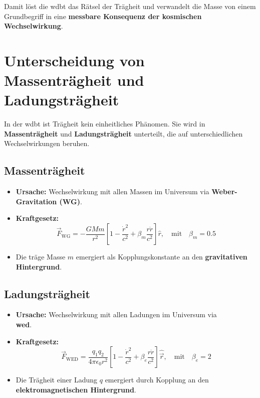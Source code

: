 Damit löst die \gls{wdbt} das Rätsel der Trägheit und verwandelt die Masse von einem Grundbegriff in eine \textbf{messbare Konsequenz der kosmischen Wechselwirkung}.

\section{Unterscheidung von Massenträgheit und Ladungsträgheit}

In der \gls{wdbt} ist Trägheit kein einheitliches Phänomen. Sie wird in \textbf{Massenträgheit} und \textbf{Ladungsträgheit} unterteilt, die auf unterschiedlichen Wechselwirkungen beruhen.

\subsection{Massenträgheit}
\begin{itemize}
    \item \textbf{Ursache:} Wechselwirkung mit allen Massen im Universum via \textbf{Weber-Gravitation (WG)}.
    \item \textbf{Kraftgesetz:}
        \[
        \vec{F}_{\text{WG}} = -\frac{G M m}{r^2} \left[ 1 - \frac{\dot{r}^2}{c^2} + \beta_m \frac{r \ddot{r}}{c^2} \right] \hat{r}, \quad \text{mit} \quad \beta_m = 0.5
        \]
    \item Die träge Masse $m$ emergiert als Kopplungskonstante an den \textbf{gravitativen Hintergrund}.
\end{itemize}

\subsection{Ladungsträgheit}
\begin{itemize}
    \item \textbf{Ursache:} Wechselwirkung mit allen Ladungen im Universum via\\\textbf{\gls{wed}}.
    \item \textbf{Kraftgesetz:}
        \begin{equation}
        \vec{F}_{\text{WED}} = \frac{q_1 q_2}{4\pi\epsilon_0 r^2} \left[ 1 - \frac{\dot{r}^2}{c^2} + \beta_e \frac{r \ddot{r}}{c^2} \right] \hat{\vec{r}}, \quad \text{mit} \quad \beta_e = 2            
        \end{equation}
    \item Die Trägheit einer Ladung $q$ emergiert durch Kopplung an den \textbf{elektromagnetischen Hintergrund}.
\end{itemize}

